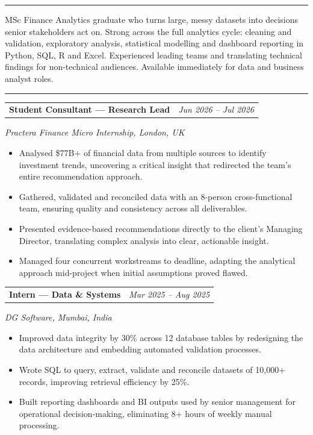 \documentclass[a4paper,10pt]{article}
\makeatletter
\newlength{\maintextw}  \setlength{\maintextw}{12.55cm} %
\newcommand{\datefont}[1]{{\fontsize{7.8}{9.5}\selectfont\itshape\color{mutedcol}#1}}
\newcommand{\heading}[2]{%
  \par\vspace{6pt}\noindent
  {\fontsize{9.4}{11}\selectfont\bfseries\textls[190]{\MakeUppercase{#2}}}%
  \par\vspace{3pt}\noindent
  \textcolor{rulecol}{\rule{#1}{0.5pt}}\par\vspace{3pt}}
\newcommand{\mnhead}[1]{\heading{\maintextw}{#1}}
\newcommand{\job}[3]{%
  \par\noindent
  \begin{tabular*}{\maintextw}{@{}p{9.1cm}@{\extracolsep{\fill}}r@{}}
    {\fontsize{9.6}{11.5}\selectfont\bfseries #1} & \datefont{#3}
  \end{tabular*}%
  \par\vspace{1.5pt}\noindent
  {\fontsize{8.7}{10.5}\selectfont\itshape\color{mutedcol}#2}\par\vspace{2pt}}
\newenvironment{cvbullets}
  {\fontsize{8.7}{10.4}\selectfont\begin{itemize}}
  {\end{itemize}\vspace{1pt}}
\makeatother
\begin{document}
\hspace{1.55cm}%
\begin{minipage}[t]{\maintextw}
\vspace{0pt}

\mnhead{Professional Profile}
{\fontsize{8.8}{11.2}\selectfont
MSc Finance Analytics graduate who turns large, messy datasets into decisions senior
stakeholders act on. Strong across the full analytics cycle: cleaning and validation,
exploratory analysis, statistical modelling and dashboard reporting in Python, SQL, R and
Excel. Experienced leading teams and translating technical findings for non-technical
audiences. Available immediately for data and business analyst roles.\par}
\vspace{2pt}

\mnhead{Experience}

\job{Student Consultant --- Research Lead}{Practera Finance Micro Internship, London, UK}{Jun 2026 -- Jul 2026}
\begin{cvbullets}
\item Analysed \$77B+ of financial data from multiple sources to identify investment
      trends, uncovering a critical insight that redirected the team's entire
      recommendation approach.
\item Gathered, validated and reconciled data with an 8-person cross-functional team,
      ensuring quality and consistency across all deliverables.
\item Presented evidence-based recommendations directly to the client's Managing
      Director, translating complex analysis into clear, actionable insight.
\item Managed four concurrent workstreams to deadline, adapting the analytical approach
      mid-project when initial assumptions proved flawed.
\end{cvbullets}

\vspace{3pt}
\job{Intern --- Data \& Systems}{DG Software, Mumbai, India}{Mar 2025 -- Aug 2025}
\begin{cvbullets}
\item Improved data integrity by 30\% across 12 database tables by redesigning the data
      architecture and embedding automated validation processes.
\item Wrote SQL to query, extract, validate and reconcile datasets of 10,000+ records,
      improving retrieval efficiency by 25\%.
\item Built reporting dashboards and BI outputs used by senior management for operational
      decision-making, eliminating 8+ hours of weekly manual processing.
\end{cvbullets}


\end{minipage}
\end{document}
